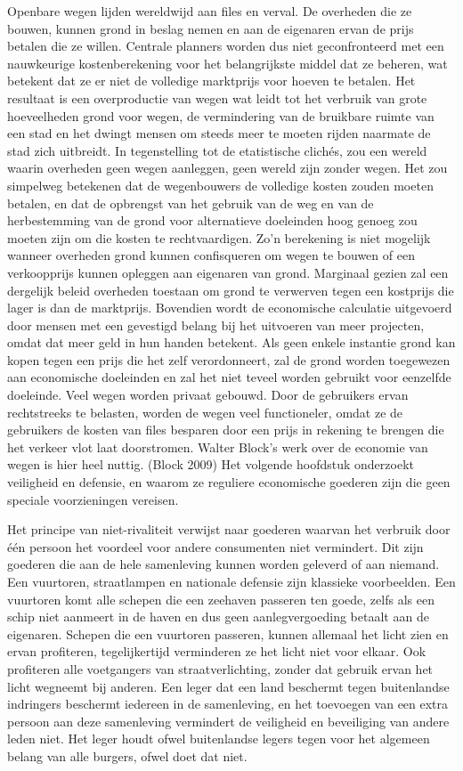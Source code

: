 \documentclass[
  a5paper,
  smalldemyvopaper,11pt,twoside,onecolumn,openright,extrafontsizes,
hidelinks]{memoir}
\begin{document}
Openbare wegen lijden wereldwijd aan files en verval. De overheden die
ze bouwen, kunnen grond in beslag nemen en aan de eigenaren ervan de
prijs betalen die ze willen. Centrale planners worden dus niet
geconfronteerd met een nauwkeurige kostenberekening voor het
belangrijkste middel dat ze beheren, wat betekent dat ze er niet de
volledige marktprijs voor hoeven te betalen. Het resultaat is een
overproductie van wegen wat leidt tot het verbruik van grote
hoeveelheden grond voor wegen, de vermindering van de bruikbare ruimte
van een stad en het dwingt mensen om steeds meer te moeten rijden
naarmate de stad zich uitbreidt. In tegenstelling tot de etatistische
clichés, zou een wereld waarin overheden geen wegen aanleggen, geen
wereld zijn zonder wegen. Het zou simpelweg betekenen dat de
wegenbouwers de volledige kosten zouden moeten betalen, en dat de
opbrengst van het gebruik van de weg en van de herbestemming van de
grond voor alternatieve doeleinden hoog genoeg zou moeten zijn om die
kosten te rechtvaardigen. Zo'n berekening is niet mogelijk wanneer
overheden grond kunnen confisqueren om wegen te bouwen of een
verkoopprijs kunnen opleggen aan eigenaren van grond. Marginaal gezien
zal een dergelijk beleid overheden toestaan om grond te verwerven tegen
een kostprijs die lager is dan de marktprijs. Bovendien wordt de
economische calculatie uitgevoerd door mensen met een gevestigd belang
bij het uitvoeren van meer projecten, omdat dat meer geld in hun handen
betekent. Als geen enkele instantie grond kan kopen tegen een prijs die
het zelf verordonneert, zal de grond worden toegewezen aan economische
doeleinden en zal het niet teveel worden gebruikt voor eenzelfde
doeleinde. Veel wegen worden privaat gebouwd. Door de gebruikers ervan
rechtstreeks te belasten, worden de wegen veel functioneler, omdat ze de
gebruikers de kosten van files besparen door een prijs in rekening te
brengen die het verkeer vlot laat doorstromen. Walter Block's werk over
de economie van wegen is hier heel nuttig. (Block 2009) Het volgende
hoofdstuk onderzoekt veiligheid en defensie, en waarom ze reguliere
economische goederen zijn die geen speciale voorzieningen vereisen.

Het principe van niet-rivaliteit verwijst naar goederen waarvan het
verbruik door één persoon het voordeel voor andere consumenten niet
vermindert. Dit zijn goederen die aan de hele samenleving kunnen worden
geleverd of aan niemand. Een vuurtoren, straatlampen en nationale
defensie zijn klassieke voorbeelden. Een vuurtoren komt alle schepen die
een zeehaven passeren ten goede, zelfs als een schip niet aanmeert in de
haven en dus geen aanlegvergoeding betaalt aan de eigenaren. Schepen die
een vuurtoren passeren, kunnen allemaal het licht zien en ervan
profiteren, tegelijkertijd verminderen ze het licht niet voor elkaar.
Ook profiteren alle voetgangers van straatverlichting, zonder dat
gebruik ervan het licht wegneemt bij anderen. Een leger dat een land
beschermt tegen buitenlandse indringers beschermt iedereen in de
samenleving, en het toevoegen van een extra persoon aan deze samenleving
vermindert de veiligheid en beveiliging van andere leden niet. Het leger
houdt ofwel buitenlandse legers tegen voor het algemeen belang van alle
burgers, ofwel doet dat niet.
\end{document}
